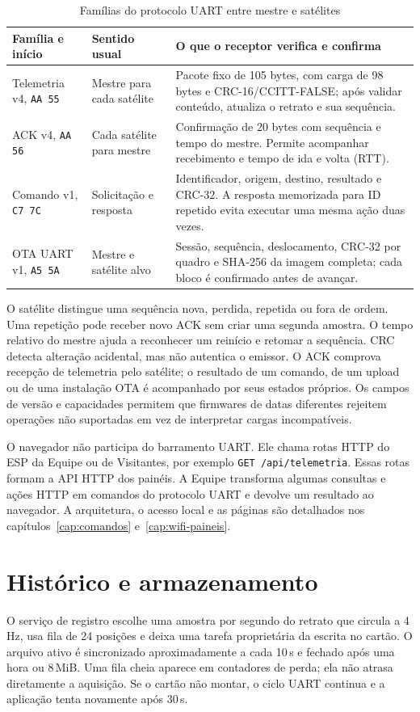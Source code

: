 \begin{table}[htbp]\centering\small
\caption{Famílias do protocolo UART entre mestre e satélites}\label{tab:familias}
\begin{tabularx}{\textwidth}{@{}p{2.6cm}p{2.4cm}X@{}}\toprule
Família e início & Sentido usual & O que o receptor verifica e confirma\\\midrule
Telemetria v4, \texttt{AA 55} & Mestre para cada satélite & Pacote fixo de 105 bytes, com carga de 98 bytes e CRC-16/CCITT-FALSE; após validar conteúdo, atualiza o retrato e sua sequência.\\
ACK v4, \texttt{AA 56} & Cada satélite para mestre & Confirmação de 20 bytes com sequência e tempo do mestre. Permite acompanhar recebimento e tempo de ida e volta (RTT).\\
Comando v1, \texttt{C7 7C} & Solicitação e resposta & Identificador, origem, destino, resultado e CRC-32. A resposta memorizada para ID repetido evita executar uma mesma ação duas vezes.\\
OTA UART v1, \texttt{A5 5A} & Mestre e satélite alvo & Sessão, sequência, deslocamento, CRC-32 por quadro e SHA-256 da imagem completa; cada bloco é confirmado antes de avançar.\\\bottomrule
\end{tabularx}\end{table}

O satélite distingue uma sequência nova, perdida, repetida ou fora de ordem. Uma repetição pode receber novo ACK sem criar uma segunda amostra. O tempo relativo do mestre ajuda a reconhecer um reinício e retomar a sequência. CRC detecta alteração acidental, mas não autentica o emissor. O ACK comprova recepção de telemetria pelo satélite; o resultado de um comando, de um upload ou de uma instalação OTA é acompanhado por seus estados próprios. Os campos de versão e capacidades permitem que firmwares de datas diferentes rejeitem operações não suportadas em vez de interpretar cargas incompatíveis.

O navegador não participa do barramento UART. Ele chama rotas HTTP do ESP da Equipe ou de Visitantes, por exemplo \texttt{GET /api/telemetria}. Essas rotas formam a API HTTP dos painéis. A Equipe transforma algumas consultas e ações HTTP em comandos do protocolo UART e devolve um resultado ao navegador. A arquitetura, o acesso local e as páginas são detalhados nos capítulos~\ref{cap:comandos} e~\ref{cap:wifi-paineis}.

\section{Histórico e armazenamento}
O serviço de registro escolhe uma amostra por segundo do retrato que circula a 4\,Hz, usa fila de 24 posições e deixa uma tarefa proprietária da escrita no cartão. O arquivo ativo é sincronizado aproximadamente a cada 10\,s e fechado após uma hora ou 8\,MiB. Uma fila cheia aparece em contadores de perda; ela não atrasa diretamente a aquisição. Se o cartão não montar, o ciclo UART continua e a aplicação tenta novamente após 30\,s.

